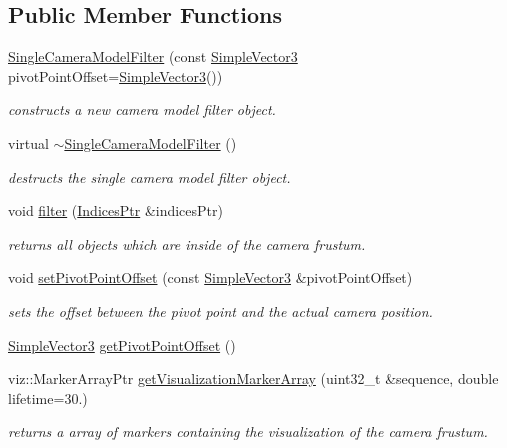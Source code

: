 \subsection*{\-Public \-Member \-Functions}
\begin{DoxyCompactItemize}
\item 
\hyperlink{classnext__best__view_1_1SingleCameraModelFilter_ad953b21f7252766a8c2fc76e9a537d0c}{\-Single\-Camera\-Model\-Filter} (const \hyperlink{namespacenext__best__view_a59fc75b908e198bc02a9b19ba88edf12}{\-Simple\-Vector3} pivot\-Point\-Offset=\hyperlink{namespacenext__best__view_a59fc75b908e198bc02a9b19ba88edf12}{\-Simple\-Vector3}())
\begin{DoxyCompactList}\small\item\em constructs a new camera model filter object. \end{DoxyCompactList}\item 
virtual \hyperlink{classnext__best__view_1_1SingleCameraModelFilter_a699ac2237bc6adc305fb8f61f538edeb}{$\sim$\-Single\-Camera\-Model\-Filter} ()
\begin{DoxyCompactList}\small\item\em destructs the single camera model filter object. \end{DoxyCompactList}\item 
void \hyperlink{classnext__best__view_1_1SingleCameraModelFilter_a7a79f48ef0338edf335235ad9375983a}{filter} (\hyperlink{namespacenext__best__view_a89edd5f370254b5c7689adfede9fe6a7}{\-Indices\-Ptr} \&indices\-Ptr)
\begin{DoxyCompactList}\small\item\em returns all objects which are inside of the camera frustum. \end{DoxyCompactList}\item 
void \hyperlink{classnext__best__view_1_1SingleCameraModelFilter_a68be7c60b145d1f20a29ddcd6a40a7c8}{set\-Pivot\-Point\-Offset} (const \hyperlink{namespacenext__best__view_a59fc75b908e198bc02a9b19ba88edf12}{\-Simple\-Vector3} \&pivot\-Point\-Offset)
\begin{DoxyCompactList}\small\item\em sets the offset between the pivot point and the actual camera position. \end{DoxyCompactList}\item 
\hyperlink{namespacenext__best__view_a59fc75b908e198bc02a9b19ba88edf12}{\-Simple\-Vector3} \hyperlink{classnext__best__view_1_1SingleCameraModelFilter_a672704857851579c57d5eb4121b955e0}{get\-Pivot\-Point\-Offset} ()
\item 
viz\-::\-Marker\-Array\-Ptr \hyperlink{classnext__best__view_1_1SingleCameraModelFilter_a6571b3bc2a6d318bbdb26183e89fd585}{get\-Visualization\-Marker\-Array} (uint32\-\_\-t \&sequence, double lifetime=30.)
\begin{DoxyCompactList}\small\item\em returns a array of markers containing the visualization of the camera frustum. \end{DoxyCompactList}\end{DoxyCompactItemize}


